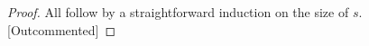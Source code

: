 \documentclass{lmcs}
\theoremstyle{theorem}\newtheorem{theorem}{Theorem}
\theoremstyle{theorem}\newtheorem{lemma}[theorem]{Lemma}
\theoremstyle{theorem}\newtheorem{corollary}[theorem]{Corollary}
\theoremstyle{definition}\newtheorem{definition}[theorem]{Definition}
\theoremstyle{definition}\newtheorem{example}[theorem]{Example}
\newcommand{\F}{\mathcal{F}}
\newcommand{\Vfree}{\mathcal{V}_{\mathit{nonb}}}
\newcommand{\Vbound}{\mathcal{V}_{\mathit{binder}}}
\newcommand{\identifier}[1]{\mathtt{#1}}
\newcommand{\afun}{\identifier{f}}
\newcommand{\avar}{x}
\newcommand{\bvar}{y}
\newcommand{\cvar}{z}
\newcommand{\abs}[2]{\lambda #1.#2}
\newcommand{\meta}[2]{#1\langle#2\rangle}
\newcommand{\tuple}[2]{\llparenthesis #1,\dots,#2 \rrparenthesis}
\begin{document}
\begin{proof}
All follow by a straightforward induction on the size of $s$. [Outcommented]
\end{proof}
\end{document}
